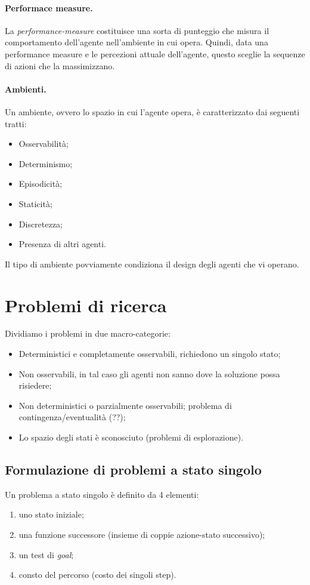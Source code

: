 \documentclass[a4paper, 11pt]{article}
\begin{document}
\paragraph{Performace measure.} La \textit{performance-measure} costituisce una sorta di punteggio che misura il comportamento dell'agente nell'ambiente in cui opera. Quindi, data una performance measure e le percezioni attuale dell'agente, questo sceglie la sequenze di azioni che la massimizzano.

\paragraph{Ambienti.} Un ambiente, ovvero lo spazio in cui l'agente opera, è caratterizzato dai seguenti tratti: \begin{itemize}
	\item Osservabilità;
	\item Determinismo;
	\item Episodicità;
	\item Staticità;
	\item Discretezza;
	\item Presenza di altri agenti.
\end{itemize}

Il tipo di ambiente povviamente condiziona il design degli agenti che vi operano.

\section{Problemi di ricerca}
Dividiamo i problemi in due macro-categorie:
\begin{itemize}
	\item Deterministici e completamente osservabili, richiedono un singolo stato;
	\item Non osservabili, in tal caso gli agenti non sanno dove la soluzione possa risiedere;
	\item Non deterministici o parzialmente osservabili; problema di contingenza/eventualità (??);
	\item Lo spazio degli stati è sconosciuto (problemi di esplorazione).
\end{itemize}

\subsection{Formulazione di problemi a stato singolo}
Un problema a stato singolo è definito da 4 elementi: \begin{enumerate}
	\item uno stato iniziale;
	\item una funzione successore (insieme di coppie azione-stato successivo);
	\item un test di \textit{goal};
	\item consto del percorso (costo dei singoli step).
\end{enumerate}
\end{document}
